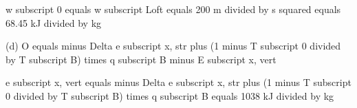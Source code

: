 w subscript 0 equals w subscript Loft equals 200 m divided by s squared equals 68.45 kJ divided by kg

(d) O equals minus Delta e subscript x, str plus (1 minus T subscript 0 divided by T subscript B) times q subscript B minus E subscript x, vert

e subscript x, vert equals minus Delta e subscript x, str plus (1 minus T subscript 0 divided by T subscript B) times q subscript B equals 1038 kJ divided by kg